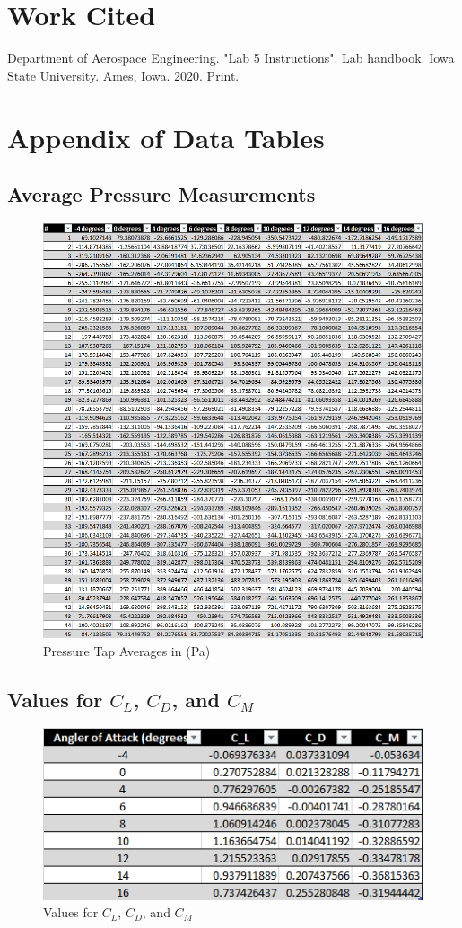 \documentclass[12pt]{article}
\begin{document}
\newpage
\section{Work Cited}
Department of Aerospace Engineering. "Lab 5 Instructions". Lab handbook. Iowa State University. Ames, Iowa. 2020. Print.
\newline

\newpage
\setcounter{section}{0}
\def\thesection{\Alph{section}}
\section{Appendix of Data Tables}
\subsection{Average Pressure Measurements}
    \begin{figure}[h]
        \includegraphics[width=15.4 cm]{png.png}
        \centering
        \caption{Pressure Tap Averages in (Pa)}
    \end{figure}
\newpage
\subsection{Values for \(C_L\), \(C_D\), and \(C_M\)}
    \begin{figure}[h]
        \includegraphics[width=10 cm]{CLCDCM.png}
        \centering
        \caption{Values for \(C_L\), \(C_D\), and \(C_M\)}
    \end{figure}
\end{document}
